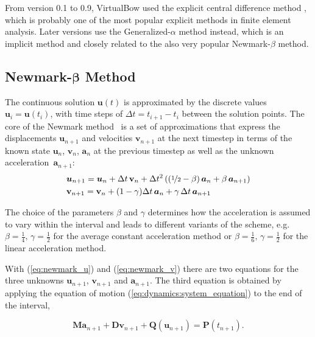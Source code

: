 From version 0.1 to 0.9, VirtualBow used the explicit central difference method \cite{bib:bathe2006}, which is probably one of the most popular explicit methods in finite element analysis.
Later versions use the Generalized-$\alpha$ method instead, which is an implicit method and closely related to the also very popular Newmark-$\beta$ method.

\subsection{Newmark-$\boldsymbol{\beta}$ Method}

The continuous solution $\boldsymbol{u}(t)$ is approximated by the discrete values~$\boldsymbol{u}_i = \boldsymbol{u}(t_{i})$, with time steps of $\Delta t = t_{i+1} - t_{i}$ between the solution points.
The core of the Newmark method~\cite{bib:bathe2006} is a set of approximations that express the displacements $\boldsymbol{u}_{n+1}$ and velocities $\mathbf{v}_{n+1}$ at the next timestep in terms of the known state $\boldsymbol{u}_{n}$, $\mathbf{v}_{n}$, $\boldsymbol{a}_{n}$ at the previous timestep as well as the unknown acceleration~$\boldsymbol{a}_{n+1}$:
%
\begin{align}
&\boldsymbol{u}_{n+1} = \boldsymbol{u}_{n} + \Delta t\,\mathbf{v}_{n} + \Delta t^2 \left( \left(\nicefrac{1}{2} - \beta\right)\boldsymbol{a}_{n} + \beta\,\boldsymbol{a}_{n+1} \right) \label{eq:newmark_u} \\
&\mathbf{v}_{n+1} = \mathbf{v}_{n} + (1 - \gamma)\Delta t\,\boldsymbol{a}_{n} + \gamma\,\Delta t\,\boldsymbol{a}_{n+1} \label{eq:newmark_v}
\end{align}

The choice of the parameters $\beta$ and $\gamma$ determines how the acceleration is assumed to vary within the interval and leads to different variants of the scheme, e.g. $\beta = \frac{1}{4},\,\gamma = \frac{1}{2}$ for the average constant acceleration method or $\beta = \frac{1}{6},\,\gamma = \frac{1}{2}$ for the linear acceleration method.

With (\ref{eq:newmark_u}) and (\ref{eq:newmark_v}) there are two equations for the three unknowns $\boldsymbol{u}_{n+1}$, $\mathbf{v}_{n+1}$ and $\boldsymbol{a}_{n+1}$.
The third equation is obtained by applying the equation of motion (\ref{eq:dynamics:system_equation}) to the end of the interval,

\begin{equation}
\boldsymbol{M}\boldsymbol{a}_{n+1} + \boldsymbol{D}\mathbf{v}_{n+1} + \boldsymbol{Q}(\boldsymbol{u}_{n+1}) = \boldsymbol{P}(t_{n+1}). \label{eq:newmark_balance}
\end{equation}

